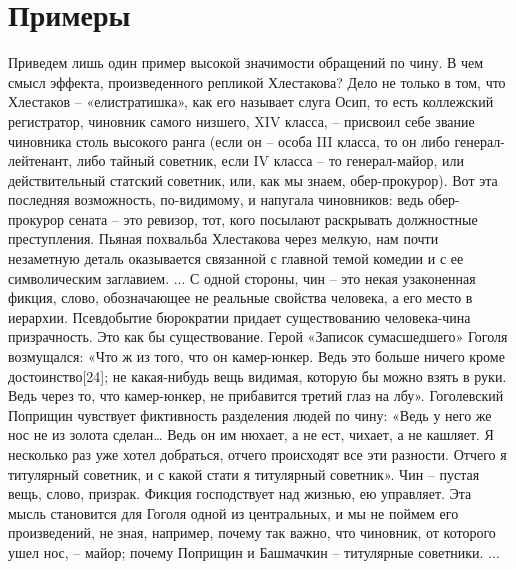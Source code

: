 \documentclass[12pt,a4paper]{article}
\begin{document}
\section{Примеры}
Приведем лишь один пример высокой значимости
обращений по чину. В чем смысл эффекта, произведенного
репликой Хлестакова? Дело не только в том, что Хлестаков –
«елистратишка», как его называет слуга Осип, то есть
коллежский регистратор, чиновник самого низшего, XIV
класса, – присвоил себе звание чиновника столь высокого
ранга (если он – особа III класса, то он либо генерал-
лейтенант, либо тайный советник, если IV класса – то
генерал-майор, или действительный статский советник, или,
как мы знаем, обер-прокурор). Вот эта последняя
возможность, по-видимому, и напугала чиновников: ведь
обер-прокурор сената – это ревизор, тот, кого посылают
раскрывать должностные преступления. Пьяная похвальба
Хлестакова через мелкую, нам почти незаметную деталь
оказывается связанной с главной темой комедии и с ее
символическим заглавием.
...
С одной стороны, чин – это некая узаконенная фикция,
слово, обозначающее не реальные свойства человека, а его
место в иерархии. Псевдобытие бюрократии придает
существованию человека-чина призрачность. Это как бы
существование. Герой «Записок сумасшедшего» Гоголя
возмущался: «Что ж из того, что он камер-юнкер. Ведь это
больше ничего кроме достоинство[24]; не какая-нибудь
вещь видимая, которую бы можно взять в руки. Ведь через
то, что камер-юнкер, не прибавится третий глаз на лбу».
Гоголевский Поприщин чувствует фиктивность разделения
людей по чину: «Ведь у него же нос не из золота сделан…
Ведь он им нюхает, а не ест, чихает, а не кашляет.
Я несколько раз уже хотел добраться, отчего происходят все
эти разности. Отчего я титулярный советник, и с какой стати
я титулярный советник». Чин – пустая вещь, слово, призрак.
Фикция господствует над жизнью, ею управляет. Эта мысль
становится для Гоголя одной из центральных, и мы не
поймем его произведений, не зная, например, почему так
важно, что чиновник, от которого ушел нос, – майор; почему
Поприщин и Башмачкин – титулярные советники.
...
\end{document}
